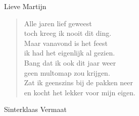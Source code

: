 \documentclass[12pt]{brief}
\date{12 augustus 2006}
\begin{document}
\begin{letter}{Lieve Martijn}

\opening{}


\begin{verse}

Alle jaren lief geweest\\
toch kreeg ik nooit dit ding.\\
Maar vanavond is het feest\\
ik had het eigenlijk al gezien.\\
Bang dat ik ook dit jaar weer\\
geen multomap zou krijgen.\\
Zat ik geenszins bij de pakken neer\\
en kocht het lekker voor mijn eigen.\\

\end{verse}


Sinterklaas Vermaat


\closing{}

\end{letter}
\end{document}
